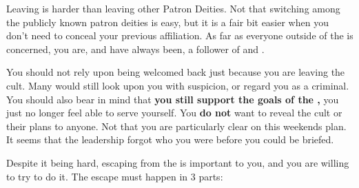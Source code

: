 \documentclass[green]{GL2020}
\begin{document}
\name{\gEscapingFoG{}}

Leaving \cGenesis{} is harder than leaving other Patron Deities. Not that switching among the publicly known patron deities is easy, but it is a fair bit easier when you don’t need to conceal your previous affiliation. As far as everyone outside of the \pGoaties{} is concerned, you are, and have always been, a follower of \cEbb{} and \cFlow{}.

You should not rely upon being welcomed back just because you are leaving the cult. Many would still look upon you with suspicion, or regard you as a criminal. You should also bear in mind that \textbf{you still support the goals of the \pGoaties{},} you just no longer feel able to serve yourself. You \textbf{do not} want to reveal the cult or their plans to anyone. Not that you are particularly clear on this weekends plan. It seems that the leadership forgot who you were before you could be briefed.

Despite it being hard, escaping from the \pGoaties{} is important to you, and you are willing to try to do it. The escape must happen in 3 parts:
\end{document}
